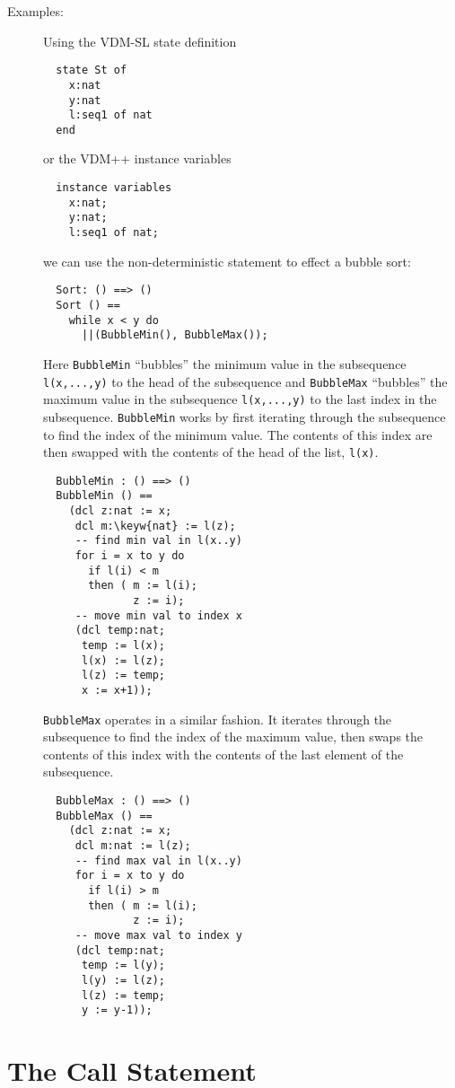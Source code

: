 \documentclass{overturerepchap}
\newcommand{\keyw}[1]{{\bf\ttfamily #1}}
\begin{document}
{\begin{description}
\item[Examples:] Using the VDM-SL
state definition
  \begin{lstlisting}
  state St of
    x:nat
    y:nat
    l:seq1 of nat
  end
  \end{lstlisting}
or the VDM++ instance variables
  \begin{lstlisting}
  instance variables
    x:nat;
    y:nat;
    l:seq1 of nat;
  \end{lstlisting}
  we can use the non-deterministic statement to effect a bubble sort:
  \begin{lstlisting}
  Sort: () ==> ()
  Sort () ==
    while x < y do
      ||(BubbleMin(), BubbleMax());
  \end{lstlisting}
\label{sortDef}
  Here \texttt{BubbleMin} ``bubbles'' the minimum value in the
  subsequence \texttt{l(x,...,y)} to the head of the subsequence and
  \texttt{BubbleMax} ``bubbles'' the maximum value in the subsequence
  \texttt{l(x,...,y)} to the last index in the
  subsequence. \texttt{BubbleMin} works by first iterating through the
  subsequence to find the index of the minimum value. The contents of
  this index are then swapped with the contents of the head of the
  list, \texttt{l(x)}.
  \begin{lstlisting}
  BubbleMin : () ==> ()
  BubbleMin () ==
    (dcl z:nat := x;
     dcl m:\keyw{nat} := l(z);
     -- find min val in l(x..y)
     for i = x to y do
       if l(i) < m
       then ( m := l(i);
              z := i);
     -- move min val to index x
     (dcl temp:nat;
      temp := l(x);
      l(x) := l(z);
      l(z) := temp;
      x := x+1));
\end{lstlisting}
\texttt{BubbleMax} operates in a similar fashion. It iterates through the
  subsequence to find the index of the maximum value, then swaps the
  contents of this index with the contents of the last element of the
  subsequence.
\begin{lstlisting}
  BubbleMax : () ==> ()
  BubbleMax () ==
    (dcl z:nat := x;
     dcl m:nat := l(z);
     -- find max val in l(x..y)
     for i = x to y do
       if l(i) > m
       then ( m := l(i);
              z := i);
     -- move max val to index y
     (dcl temp:nat;
      temp := l(y);
      l(y) := l(z);
      l(z) := temp;
      y := y-1));
  \end{lstlisting}
\end{description}

\section{The Call Statement}
\label{call-stmt}

}
\end{document}
